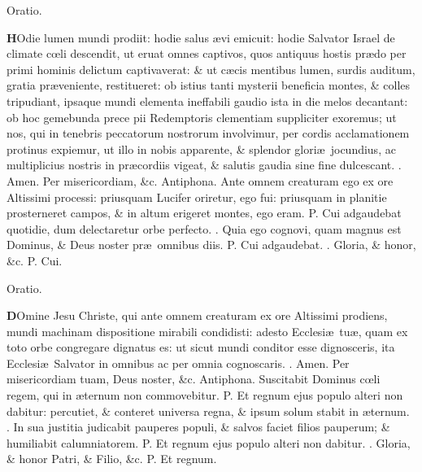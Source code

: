 \documentclass[letter,11pt]{book}
\makeatletter
\DeclareRobustCommand{\Vbar}{\vers@resp{-0.1em}{V}}
\DeclareRobustCommand{\Rbar}{\vers@resp{0pt}{R}}
\newcommand{\vers@resp@sym}{\raisebox{0.2ex}{\rotatebox[origin=c]{-20}{$\m@th\rceil$}}}
\newcommand{\vers@resp}[2]{%
  {\ooalign{\hidewidth\kern#1\vers@resp@sym\hidewidth\cr#2\cr}}%
}%
\def\P{\color{Red} P. \color{black}}
\def\V{\color{Red} \Vbar . \color{black}}
\def\R{\color{Red} \Rbar . \color{black}}
\makeatother
\begin{document}
\begin{multicols*}{2}
\vspace{-.5em} \begin{center} \color{Red} Oratio. \color{black} \end{center} \vspace{-.5em}
\lettrine[lines=2]{\bfseries \color{Red} H}{}Odie lumen mundi prodiit: hodie salus \ae vi emicuit: hodie Salvator Israel de climate c\oe li descendit, ut eruat omnes captivos, quos antiquus hostis pr\ae do per primi hominis delictum captivaverat: \& ut c\ae cis mentibus lumen, surdis auditum, gratia pr\ae veniente, restitueret: ob istius tanti mysterii beneficia montes, \& colles tripudiant, ipsaque mundi elementa ineffabili gaudio ista in die melos decantant: ob hoc gemebunda prece pii Redemptoris clementiam suppliciter exoremus; ut nos, qui in tenebris peccatorum nostrorum involvimur, per cordis acclamationem protinus expiemur, ut illo in nobis apparente, \& splendor glori\ae \ jocundius, ac multiplicius nostris in pr\ae cordiis vigeat, \& salutis gaudia sine fine dulcescant. \R Amen. Per misericordiam, \&c.
\newline \color{Red} Antiphona. \color{black} Ante omnem creaturam ego ex ore Altissimi processi: priusquam Lucifer oriretur, ego fui: priusquam in planitie prosterneret campos, \& in altum erigeret montes, ego eram. \P Cui adgaudebat quotidie, dum delectaretur orbe perfecto. \V Quia ego cognovi, quam magnus est Dominus, \& Deus noster pr\ae \ omnibus diis. \P Cui adgaudebat. \V Gloria, \& honor, \&c. \P Cui.
\vspace{-.5em} \begin{center} \color{Red} Oratio. \color{black} \end{center} \vspace{-.5em}
\lettrine[lines=2]{\bfseries \color{Red} D}{}Omine Jesu Christe, qui ante omnem creaturam ex ore Altissimi prodiens, mundi machinam dispositione mirabili condidisti: adesto Ecclesi\ae \ tu\ae , quam ex toto orbe congregare dignatus es: ut sicut mundi conditor esse dignosceris, ita Ecclesi\ae \ Salvator in omnibus ac per omnia cognoscaris. \R Amen. Per misericordiam tuam, Deus noster, \&c.
\newline \color{Red} Antiphona. \color{black} Suscitabit Dominus c\oe li regem, qui in \ae ternum non commovebitur. \P Et regnum ejus populo alteri non dabitur: percutiet, \& conteret universa regna, \& ipsum solum stabit in \ae ternum. \V In sua justitia judicabit pauperes populi, \& salvos faciet filios pauperum; \& humiliabit calumniatorem. \P Et regnum ejus populo alteri non dabitur. \V Gloria, \& honor Patri, \& Filio, \&c. \P Et regnum.

\end{multicols*}
\end{document}
